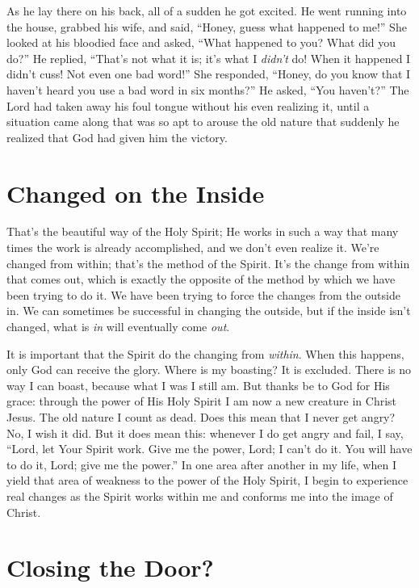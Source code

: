 As he lay there on his back, all of a sudden he got
excited. He went running into the house, grabbed his wife,
and said, “Honey, guess what happened to me!” She looked
at his bloodied face and asked, “What happened to you?
What did you do?” He replied, “That’s not what it is; it’s
what I \emph{didn’t} do! When it happened I didn’t cuss! Not even
one bad word!” She responded, “Honey, do you know that
I haven’t heard you use a bad word in six months?” He
asked, “You haven’t?” The Lord had taken away his foul
tongue without his even realizing it, until a situation came
along that was so apt to arouse the old nature that suddenly
he realized that God had given him the victory.


\section*{Changed on the Inside}

That’s the beautiful way of the Holy Spirit; He works
in such a way that many times the work is already accomplished,
and we don’t even realize it. We’re changed from
within; that’s the method of the Spirit. It’s the change from
within that comes out, which is exactly the opposite of the
method by which we have been trying to do it. We have
been trying to force the changes from the outside in. We can
sometimes be successful in changing the outside, but if the
inside isn’t changed, what is \emph{in} will eventually come \emph{out}.

It is important that the Spirit do the changing from
\emph{within}. When this happens, only God can receive the glory.
Where is my boasting? It is excluded. There is no way I can
boast, because what I was I still am. But thanks be to God
for His grace: through the power of His Holy Spirit I am
now a new creature in Christ Jesus. The old nature I count
as dead. Does this mean that I never get angry? No, I wish it
did. But it does mean this: whenever I do get angry and fail,
I say, “Lord, let Your Spirit work. Give me the power, Lord; I
can’t do it. You will have to do it, Lord; give me the power.”
In one area after another in my life, when I yield that area
of weakness to the power of the Holy Spirit, I begin to experience
real changes as the Spirit works within me and conforms
me into the image of Christ.


\section*{Closing the Door?}

